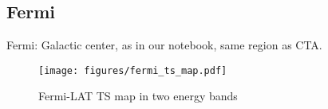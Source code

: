 \subsection{Fermi}
\label{ssec:fermi}

Fermi: Galactic center, as in our notebook, same region as CTA.

\begin{figure*}[t]
	\centering
	\texttt{[image: figures/fermi\_ts\_map.pdf]}
	\caption{
		Fermi-LAT TS map in two energy bands} \label{fig:fermi_ts_map} \end{figure*}